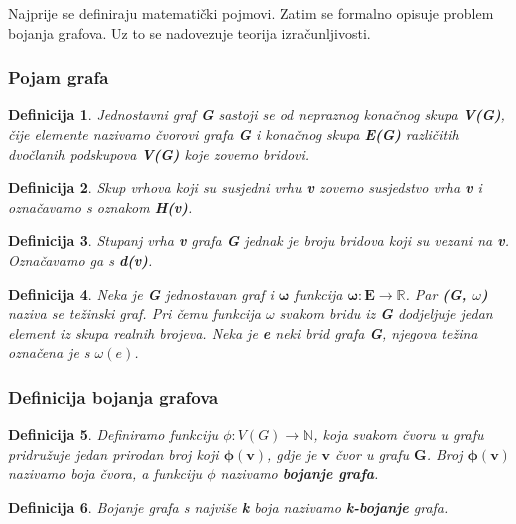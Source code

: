 \documentclass[times, utf8, diplomski, numeric]{fer}
\newtheorem{definition}{Definicija}
\begin{document}
Najprije se definiraju matematički pojmovi. Zatim se formalno opisuje problem bojanja grafova. Uz to se nadovezuje teorija izračunljivosti.

\subsubsection{Pojam grafa}

\begin{definition}
Jednostavni graf \textbf{G} sastoji se od nepraznog konačnog skupa \textbf{V(G)}, čije elemente nazivamo čvorovi grafa \textbf{G} i konačnog skupa \textbf{E(G)} različitih dvočlanih podskupova \textbf{V(G)} koje zovemo bridovi.
\end{definition}

\begin{definition}
Skup vrhova koji su susjedni vrhu \textbf{v} zovemo susjedstvo vrha \textbf{v} i označavamo s oznakom \textbf{H(v)}.
\end{definition}

\begin{definition}
Stupanj vrha \textbf{v} grafa \textbf{G} jednak je broju bridova koji su vezani na \textbf{v}. Označavamo ga s \textbf{d(v)}.
\end{definition}

\begin{definition}
Neka je \textbf{G} jednostavan graf i $\mathbf{\omega}$ funkcija $\mathbf{\omega : E \rightarrow \mathbb{R}}$. Par \textbf{(G, $\omega$)} naziva se težinski graf. Pri čemu funkcija $\omega$ svakom bridu iz \textbf{G} dodjeljuje jedan element iz skupa realnih brojeva. Neka je \textbf{e} neki brid grafa \textbf{G}, njegova težina označena je s $\omega(\mathbf{\mathit{e}})$.	 
\end{definition}


\subsubsection{Definicija bojanja grafova}

\begin{definition}
Definiramo funkciju $\phi : V(G) \rightarrow \mathbb{N}$, koja svakom čvoru u grafu pridružuje jedan prirodan broj koji $\mathbf{\phi(v)}$, gdje je $\mathbf{v}$ čvor u grafu $\mathbf{G}$. Broj $\mathbf{\phi(v)}$ nazivamo boja čvora, a funkciju $\phi$ nazivamo \textbf{bojanje grafa}. 
\end{definition}

\begin{definition}
Bojanje grafa s najviše \textbf{k} boja nazivamo \textbf{k-bojanje} grafa. 
\end{definition}
\end{document}
